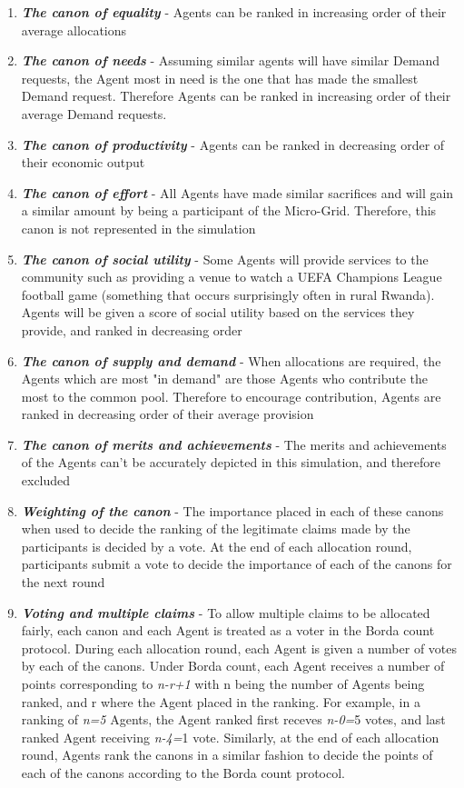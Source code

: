 \begin{enumerate}
	\item \textbf{\textit{The canon of equality}} - Agents can be ranked in increasing order of their average allocations
	\item \textbf{\textit{The canon of needs}} - Assuming similar agents will have similar Demand requests, the Agent most in need is the one that has made the smallest Demand request. Therefore Agents can be ranked in increasing order of their average Demand requests.
	\item \textbf{\textit{The canon of productivity}} - Agents can be ranked in decreasing order of their economic output
	\item \textbf{\textit{The canon of effort}} - All Agents have made similar sacrifices and will gain a similar amount by being a participant of the Micro-Grid. Therefore, this canon is not represented in the simulation
	\item \textbf{\textit{The canon of social utility}} - Some Agents will provide services to the community such as providing a venue to watch a UEFA Champions League football game (something that occurs surprisingly often in rural Rwanda). Agents will be given a score of social utility based on the services they provide, and ranked in decreasing order
	\item \textbf{\textit{The canon of supply and demand}} - When allocations are required, the Agents which are most "in demand" are those Agents who contribute the most to the common pool. Therefore to encourage contribution, Agents are ranked in decreasing order of their average provision
	\item \textbf{\textit{The canon of merits and achievements}} - The merits and achievements of the Agents can't be accurately depicted in this simulation, and therefore excluded
	\item \textbf{\textit{Weighting of the canon}} - The importance placed in each of these canons when used to decide the ranking of the legitimate claims made by the participants is decided by a vote. At the end of each allocation round, participants submit a vote to decide the importance of each of the canons for the next round
	\item \textbf{\textit{Voting and multiple claims}} - To allow multiple claims to be allocated fairly, each canon and each Agent is treated as a voter in the Borda count protocol. During each allocation round, each Agent is given a number of votes by each of the canons. Under Borda count, each Agent receives a number of points corresponding to \textit{n-r+1} with n being the number of Agents being ranked, and r where the Agent placed in the ranking. For example, in a ranking of \textit{n=5} Agents, the Agent ranked first receves \textit{n-0=}5 votes, and last ranked Agent receiving \textit{n-4=}1 vote. Similarly, at the end of each allocation round, Agents rank the canons in a similar fashion to decide the points of each of the canons according to the Borda count protocol.
\end{enumerate}


